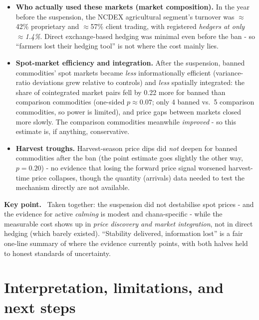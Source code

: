 \documentclass[11pt]{article}
\newenvironment{keybox}
  {\begin{framed}\noindent\textbf{Key point.}\ }
  {\end{framed}}
\begin{document}
\begin{itemize}[leftmargin=1.6em,itemsep=2pt]
  \item \textbf{Who actually used these markets (market composition).} In the year before
        the suspension, the NCDEX agricultural segment's turnover was $\approx$42\%
        proprietary and $\approx$57\% client trading, with registered \emph{hedgers at
        only $\approx$1.4\%}. Direct exchange-based hedging was minimal even before the
        ban - so ``farmers lost their hedging tool'' is not where the cost mainly lies.
  \item \textbf{Spot-market efficiency and integration.} After the suspension, banned
        commodities' spot markets became \emph{less} informationally efficient
        (variance-ratio deviations grew relative to controls) and \emph{less} spatially
        integrated: the share of cointegrated market pairs fell by 0.22 more for banned
        than comparison commodities (one-sided $p\approx0.07$; only 4 banned vs.\ 5
        comparison commodities, so power is limited), and price gaps between markets
        closed more slowly. The comparison commodities meanwhile \emph{improved} -
        so this estimate is, if anything, conservative.
  \item \textbf{Harvest troughs.} Harvest-season price dips did \emph{not} deepen for
        banned commodities after the ban (the point estimate goes slightly the other way,
        $p=0.20$) - no evidence that losing the forward price signal worsened
        harvest-time price collapses, though the quantity (arrivals) data needed to test
        the mechanism directly are not available.
\end{itemize}

\begin{keybox}
Taken together: the suspension did not destabilise spot prices - and the evidence for
active \emph{calming} is modest and chana-specific - while the measurable cost shows up
in \emph{price discovery and market integration}, not in direct hedging (which barely
existed). ``Stability delivered, information lost'' is a fair one-line summary of where
the evidence currently points, with both halves held to honest standards of uncertainty.
\end{keybox}

\section{Interpretation, limitations, and next steps}
\label{sec:limits}
\end{document}
